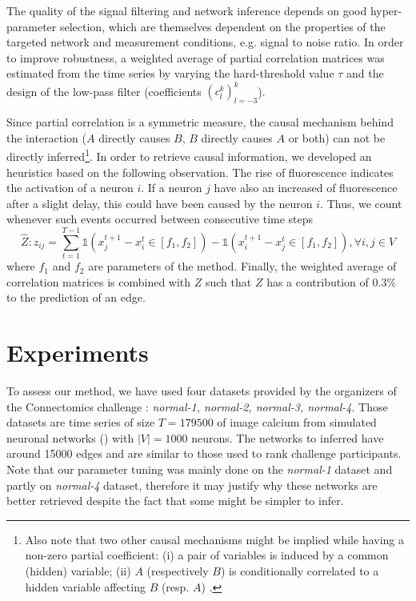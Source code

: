 \documentclass[wcp]{jmlr}
\begin{document}
The quality of the signal filtering and network inference depends on
good hyper-parameter selection, which are themselves dependent on the properties
of the targeted network and measurement conditions, e.g. signal to noise ratio.
In order to improve robustness, a weighted average of partial correlation
matrices was estimated from the time series by varying the hard-threshold value
$\tau$ and the design of the low-pass filter (coefficients $(c_l^k)_{l=-3}^k$).


Since partial correlation is a symmetric measure, the causal mechanism behind the
interaction ($A$ directly causes $B$, $B$ directly causes $A$ or both) can not
be directly inferred\footnote{Also note that two other causal mechanisms might be
implied while having a non-zero partial coefficient: (i) a pair of variables
is induced by a common (hidden) variable; (ii) $A$ (respectively $B$) is
conditionally correlated to a hidden variable affecting $B$ (resp. $A$)
\cite{de2004discovery}.}.
In order to retrieve causal information, we developed an
heuristics based on the following observation. The rise of fluorescence
indicates the activation of a neuron $i$. If a neuron $j$ have also
an increased of fluorescence after a slight delay, this could have been
caused by the neuron $i$. Thus, we count whenever
such events occurred between consecutive time steps
\[
\hat{Z}: z_{ij} = \sum_{t=1}^{T - 1}
    \mathbb{1}(x_j^{t+1} - x_i^t \in \left[f_1, f_2 \right]) -
    \mathbb{1}(x_i^{t+1} - x_j^t \in \left[f_1, f_2 \right]), \forall i, j \in V
\]
where $f_1$ and $f_2$ are parameters of the method.
Finally, the weighted average of correlation matrices is combined with $Z$ such
that $Z$ has a contribution of $0.3\%$ to the prediction of an edge.


\section{Experiments}

To assess our method, we have used four datasets provided by the organizers
of the Connectomics challenge : \textit{normal-1, normal-2, normal-3, normal-4}.
Those datasets are time series of size $T=179500$ of image calcium from simulated
neuronal networks (\cite{stetter2012model}) with $|V|=1000$ neurons. The networks
to inferred have around 15000 edges and are similar to those
used to rank challenge participants. Note that our parameter tuning was mainly
done on the \textit{normal-1} dataset and partly on \textit{normal-4} dataset,
therefore it may justify why these networks are better retrieved despite the
fact that some might be simpler to infer.
\end{document}
